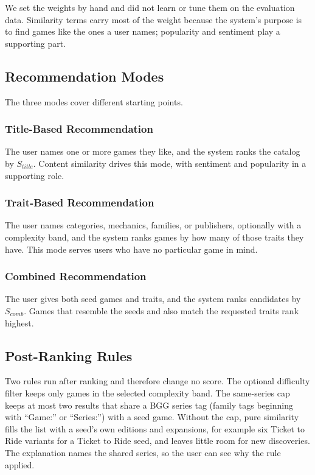 \documentclass[conference]{IEEEtran}
\begin{document}
We set the weights by hand and did not learn or tune them on the evaluation data. Similarity terms carry most of the weight because the system's purpose is to find games like the ones a user names; popularity and sentiment play a supporting part.

\subsection{Recommendation Modes}

The three modes cover different starting points.

\subsubsection{Title-Based Recommendation}

The user names one or more games they like, and the system ranks the catalog by $S_{title}$. Content similarity drives this mode, with sentiment and popularity in a supporting role.

\subsubsection{Trait-Based Recommendation}

The user names categories, mechanics, families, or publishers, optionally with a complexity band, and the system ranks games by how many of those traits they have. This mode serves users who have no particular game in mind.

\subsubsection{Combined Recommendation}

The user gives both seed games and traits, and the system ranks candidates by $S_{comb}$. Games that resemble the seeds and also match the requested traits rank highest.

\subsection{Post-Ranking Rules}

Two rules run after ranking and therefore change no score. The optional difficulty filter keeps only games in the selected complexity band. The same-series cap keeps at most two results that share a BGG series tag (family tags beginning with ``Game:'' or ``Series:'') with a seed game. Without the cap, pure similarity fills the list with a seed's own editions and expansions, for example six Ticket to Ride variants for a Ticket to Ride seed, and leaves little room for new discoveries. The explanation names the shared series, so the user can see why the rule applied.
\end{document}
